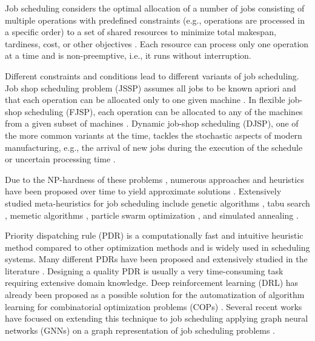 

Job scheduling considers the optimal allocation of a number of jobs consisting of multiple operations with predefined constraints (e.g., operations are processed in a 
specific order) to a set of shared resources to minimize total makespan, tardiness, cost, or other objectives \cite{YamadaNakanoJSSP}. Each resource can process only one operation at a time and is non-preemptive, i.e., it runs without interruption.
\par
Different constraints and conditions lead to different variants of job scheduling. 
Job shop scheduling problem (JSSP) assumes all jobs to be known apriori and that each operation can be allocated only to one given machine \cite{YamadaNakanoJSSP}. In flexible job-shop scheduling (FJSP), each operation can be allocated to any of the machines from a given subset of machines \cite{DAUZEREPERES2024409}. Dynamic job-shop scheduling (DJSP), one of the more common variants at the time, tackles the stochastic aspects of modern manufacturing, e.g., the arrival of new jobs during the execution of the schedule or uncertain processing time \cite{MOHAN201934}.
\par
Due to the NP-hardness of these problems \cite{Garey1976TheCO}, numerous approaches and heuristics have been proposed over time to yield approximate solutions \cite{Jansen2000ApproximationAF}. Extensively studied meta-heuristics for job scheduling include genetic algorithms \cite{PEZZELLA20083202, zhang2011effective}, tabu search \cite{Brandimarte_1993}, memetic algorithms \cite{frutos2010memetic}, particle swarm optimization \cite{ZHANG20091309}, and simulated annealing \cite{Yamada1996}.
\par
Priority dispatching rule (PDR) \cite{Haupt1989ASO} is a computationally fast and intuitive heuristic method compared to other optimization methods and is widely used in scheduling systems. Many different PDRs have been proposed and extensively studied in the literature \cite{doi:10.1080/00207543.2011.611539}. Designing a quality PDR is usually a very time-consuming task requiring extensive domain knowledge. Deep reinforcement learning (DRL) has already been proposed as a possible solution for the automatization of algorithm learning for combinatorial optimization problems (COPs) \cite{bengio2020machine}. Several recent works have focused on extending this technique to job scheduling \cite{zhang2020learning, https://doi.org/10.1002/tee.23788, DBLP:journals/corr/abs-2106-01086, 10114974, 9826438, 10226873} applying graph neural networks (GNNs) on a graph representation of job scheduling problems \cite{BLAZEWICZ2000317}. 


